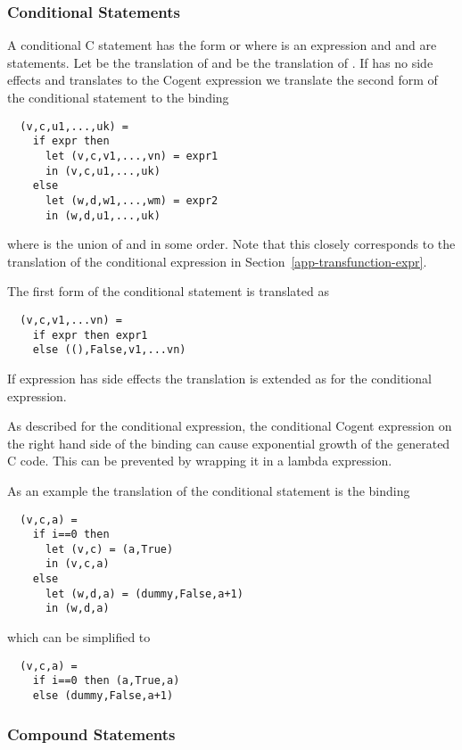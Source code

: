 \subsubsection{Conditional Statements}

A conditional C statement has the form  or  where  is an expression
and  and  are statements. Let  be the translation 
of  and  be the translation of .
If  has no side effects and translates to the Cogent expression  we translate
the second form of the conditional statement to the binding
\begin{verbatim}
  (v,c,u1,...,uk) =
    if expr then 
      let (v,c,v1,...,vn) = expr1
      in (v,c,u1,...,uk)
    else
      let (w,d,w1,...,wm) = expr2
      in (w,d,u1,...,uk)
\end{verbatim}
where  is the union of  and  in some order. 
Note that this closely corresponds to the translation 
of the conditional expression in Section~\ref{app-transfunction-expr}.

The first form of the conditional statement is translated as
\begin{verbatim}
  (v,c,v1,...vn) =
    if expr then expr1
    else ((),False,v1,...vn)
\end{verbatim}

If expression  has side effects the translation is extended as for the conditional expression.

As described for the conditional expression, the conditional Cogent expression on the right hand side of the binding
can cause exponential growth of the generated C code. This can be prevented by wrapping it in a lambda expression.

As an example the translation of the conditional statement  is the binding
\begin{verbatim}
  (v,c,a) =
    if i==0 then 
      let (v,c) = (a,True)
      in (v,c,a)
    else
      let (w,d,a) = (dummy,False,a+1)
      in (w,d,a)
\end{verbatim}
which can be simplified to
\begin{verbatim}
  (v,c,a) =
    if i==0 then (a,True,a)
    else (dummy,False,a+1)
\end{verbatim}

\subsubsection{Compound Statements}

